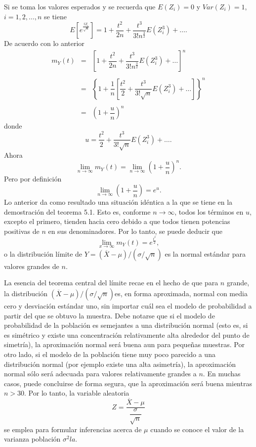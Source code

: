\begin{teo}
    Si se toma los valores esperados y se recuerda que $E(Z_i)=0$ y $Var(Z_i)=1$, $i=1,2,\ldots,n$ se tiene
    $$E\left[e^{\frac{tZ_i}{\sqrt{n}}}\right]=1+\dfrac{t^2}{2n}+\dfrac{t^3}{3!n^{\frac{3}{2}}}E\left(Z_i^3\right)+\ldots.$$
    De acuerdo con lo anterior
    $$
    \begin{array}{rcl}
	m_Y(t) &=& \left[1+\dfrac{t^2}{2n}+\dfrac{t^3}{3!n^{\frac{3}{2}}}E\left(Z_i^3\right)+\ldots\right]^n\\\\
	       &=& \left\{1+\dfrac{1}{n}\left[\dfrac{t^2}{2}+\dfrac{t^3}{3!\sqrt{n}}E\left(Z_i^3\right)+\ldots\right]\right\}^n\\\\
	       &=& \left(1+\dfrac{u}{n}\right)^n
    \end{array}
    $$
    donde
    $$u=\dfrac{t^2}{2}+\dfrac{t^3}{3!\sqrt{n}}E\left(Z_i^3\right)+\ldots.$$
    Ahora
    $$\lim_{n\to \infty}m_Y(t)=\lim_{n\to \infty}\left(1+\dfrac{u}{n}\right)^n.$$
    Pero por definición 
    $$\lim_{n\to \infty}\left(1+\dfrac{u}{n}\right)=e^u.$$
    Lo anterior da como resultado una situación idéntica a la que se tiene en la demostración del teorema 5.1. Esto es, conforme $n\to \infty$, todos los términos en $u$, excepto el primero, tienden hacia cero debido a que todos tienen potencias positivas de $n$ en sus denominadores. Por lo tanto, se puede deducir que
    $$\lim_{x\to \infty}m_Y(t)=e^{\frac{t^2}{2}},$$
    o la distribución límite de $Y=(\overline{X}-\mu)/(\sigma/\sqrt{n})$ es la normal estándar para valores grandes de $n$.
\end{teo}

La esencia del teorema central del límite recae en el hecho de que para $n$ grande, la distribución $(\overline{X}-\mu)/(\sigma/\sqrt{n})$es, en forma aproximada, normal con media cero y desviación estándar uno, sin importar cuál sea el modelo de probabilidad a partir del que se obtuvo la muestra. Debe notarse que si el modelo de probabilidad de la población es semejantes a una distribución normal (esto es, si es simétrico y existe una concentración relativamente alta alrededor del punto de simetría), la aproximación normal será buena aun para pequeñas muestras. Por otro lado, si el modelo de la población tiene muy poco parecido a una distribución normal (por ejemplo existe una alta asimetría), la aproximación normal sólo será adecuada para valores relativamente grandes a $n$. En muchas casos, puede concluirse de forma segura, que la aproximación será buena mientras $n>30$. Por lo tanto, la variable aleatoria
$$Z=\dfrac{\overline{X}-\mu}{\dfrac{\sigma}{\sqrt{n}}}$$
se emplea para formular inferencias acerca de $\mu$ cuando se conoce el valor de la varianza población $\sigma^2la.$

